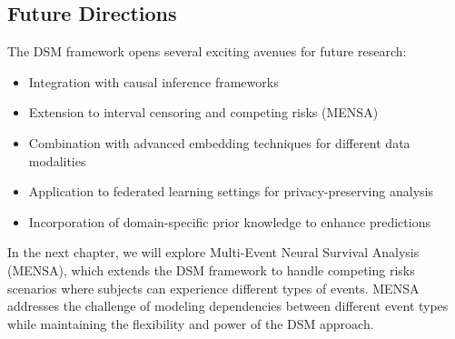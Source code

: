 \subsection{Future Directions}

The DSM framework opens several exciting avenues for future research:
\begin{itemize}
    \item Integration with causal inference frameworks
    \item Extension to interval censoring and competing risks (MENSA)
    \item Combination with advanced embedding techniques for different data modalities
    \item Application to federated learning settings for privacy-preserving analysis
    \item Incorporation of domain-specific prior knowledge to enhance predictions
\end{itemize}

\begin{notebox}[title=Looking Ahead]
In the next chapter, we will explore Multi-Event Neural Survival Analysis (MENSA), which extends the DSM framework to handle competing risks scenarios where subjects can experience different types of events. MENSA addresses the challenge of modeling dependencies between different event types while maintaining the flexibility and power of the DSM approach.
\end{notebox}
